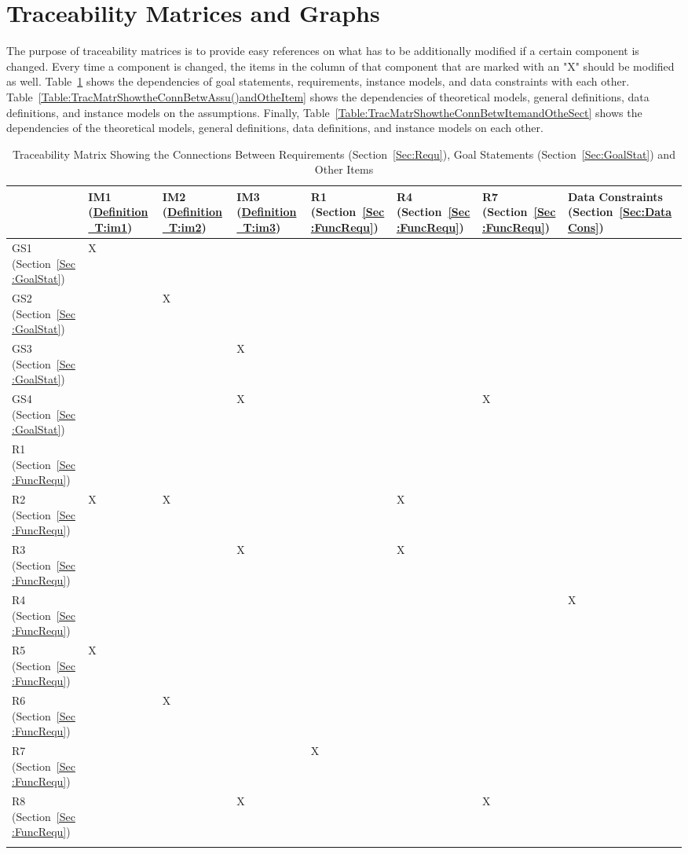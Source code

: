 \documentclass[12pt]{article}
\begin{document}
\section{Traceability Matrices and Graphs}
\label{Sec:TracMatrandGrap}
The purpose of traceability matrices is to provide easy references on what has to be additionally modified if a certain component is changed. Every time a component is changed, the items in the column of that component that are marked with an "X" should be modified as well. Table~\ref{Table:TracMatrShowtheConnBetwRequ()GoalStat()andOtheItem} shows the dependencies of goal statements, requirements, instance models, and data constraints with each other. Table~\ref{Table:TracMatrShowtheConnBetwAssu()andOtheItem} shows the dependencies of theoretical models, general definitions, data definitions, and instance models on the assumptions. Finally, Table~\ref{Table:TracMatrShowtheConnBetwItemandOtheSect} shows the dependencies of the theoretical models, general definitions, data definitions, and instance models on each other.
\begin{longtable}{l l l l l l l l}
\toprule
 & IM1 (\hyperref[T:im1]{Definition~T:im1}) & IM2 (\hyperref[T:im2]{Definition~T:im2}) & IM3 (\hyperref[T:im3]{Definition~T:im3}) & R1 (Section~\ref{Sec:FuncRequ}) & R4 (Section~\ref{Sec:FuncRequ}) & R7 (Section~\ref{Sec:FuncRequ}) & Data Constraints (Section~\ref{Sec:DataCons})
\\
\midrule
GS1 (Section~\ref{Sec:GoalStat}) & X &  &  &  &  &  & 
\\
GS2 (Section~\ref{Sec:GoalStat}) &  & X &  &  &  &  & 
\\
GS3 (Section~\ref{Sec:GoalStat}) &  &  & X &  &  &  & 
\\
GS4 (Section~\ref{Sec:GoalStat}) &  &  & X &  &  & X & 
\\
R1 (Section~\ref{Sec:FuncRequ}) &  &  &  &  &  &  & 
\\
R2 (Section~\ref{Sec:FuncRequ}) & X & X &  &  & X &  & 
\\
R3 (Section~\ref{Sec:FuncRequ}) &  &  & X &  & X &  & 
\\
R4 (Section~\ref{Sec:FuncRequ}) &  &  &  &  &  &  & X
\\
R5 (Section~\ref{Sec:FuncRequ}) & X &  &  &  &  &  & 
\\
R6 (Section~\ref{Sec:FuncRequ}) &  & X &  &  &  &  & 
\\
R7 (Section~\ref{Sec:FuncRequ}) &  &  &  & X &  &  & 
\\
R8 (Section~\ref{Sec:FuncRequ}) &  &  & X &  &  & X & 
\\
\bottomrule
\caption{Traceability Matrix Showing the Connections Between Requirements (Section~\ref{Sec:Requ}), Goal Statements (Section~\ref{Sec:GoalStat}) and Other Items}
\label{Table:TracMatrShowtheConnBetwRequ()GoalStat()andOtheItem}
\end{longtable}
\end{document}
